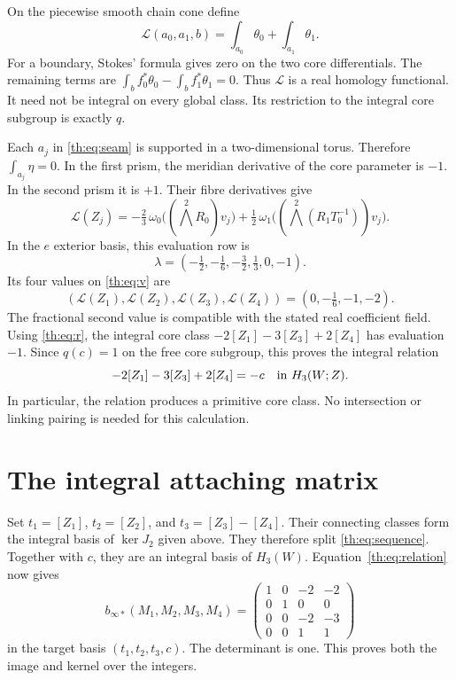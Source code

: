 On the piecewise smooth chain cone define
\[
\mathcal L(a_0,a_1,b)=\int_{a_0}\theta_0+\int_{a_1}\theta_1.
\]
For a boundary, Stokes' formula gives zero on the two core differentials.
The remaining terms are
$\int_b f_0^*\theta_0-\int_b f_1^*\theta_1=0$.
Thus $\mathcal L$ is a real homology functional.
It need not be integral on every global class.
Its restriction to the integral core subgroup is exactly $q$.

Each $a_j$ in \eqref{th:eq:seam} is supported in a two-dimensional torus.
Therefore $\int_{a_j}\eta=0$.
In the first prism, the meridian derivative of the core parameter is $-1$.
In the second prism it is $+1$.
Their fibre derivatives give
\begin{equation}\label{th:eq:evaluation}
\mathcal L(Z_j)
=-\tfrac23\,\omega_0\bigl((\bigwedge^2R_0)v_j\bigr)
 {}+\tfrac12\,\omega_1\bigl((\bigwedge^2(R_1T_0^{-1}))v_j\bigr).
\end{equation}
In the $e$ exterior basis, this evaluation row is
\[
\lambda=(-\tfrac12,-\tfrac16,-\tfrac32,\tfrac13,0,-1).
\]
Its four values on \eqref{th:eq:v} are
\begin{equation}\label{th:eq:values}
(\mathcal L(Z_1),\mathcal L(Z_2),\mathcal L(Z_3),\mathcal L(Z_4))
=(0,-\tfrac16,-1,-2).
\end{equation}
The fractional second value is compatible with the stated real coefficient field.
Using \eqref{th:eq:r}, the integral core class
$-2[Z_1]-3[Z_3]+2[Z_4]$ has evaluation $-1$.
Since $q(c)=1$ on the free core subgroup, this proves the integral relation
\begin{equation}\label{th:eq:relation}
-2[Z_1]-3[Z_3]+2[Z_4]=-c
\quad\hbox{in }H_3(W;\mathbb Z).
\end{equation}
In particular, the relation produces a primitive core class.
No intersection or linking pairing is needed for this calculation.

\section{The integral attaching matrix}

Set
$t_1=[Z_1]$, $t_2=[Z_2]$, and $t_3=[Z_3]-[Z_4]$.
Their connecting classes form the integral basis of $\ker J_2$ given above.
They therefore split \eqref{th:eq:sequence}.
Together with $c$, they are an integral basis of $H_3(W)$.
Equation~\eqref{th:eq:relation} now gives
\begin{equation}\label{th:eq:meridianmatrix}
b_{\infty*}(M_1,M_2,M_3,M_4)=
\begin{pmatrix}
1&0&-2&-2\\0&1&0&0\\0&0&-2&-3\\0&0&1&1
\end{pmatrix}
\end{equation}
in the target basis $(t_1,t_2,t_3,c)$.
The determinant is one.
This proves both the image and kernel over the integers.

